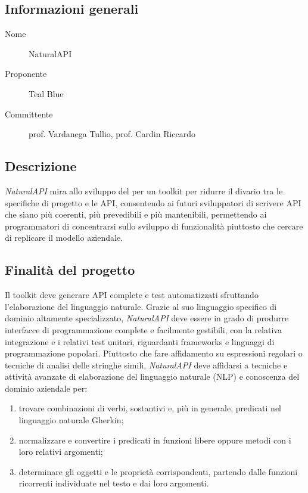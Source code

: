 \documentclass[../studio-di-fattibilita.tex]{subfiles}
\begin{document}
  \subsection{Informazioni generali}%
  \label{subsec:informazioni_generali}
  \begin{description}
    \item[Nome] NaturalAPI
    \item[Proponente] Teal Blue
    \item[Committente] prof. Vardanega Tullio, prof. Cardin Riccardo
  \end{description}


  \subsection{Descrizione}%
  \label{subsec:descrizione}
  \textit{NaturalAPI} mira allo sviluppo del  per un toolkit per ridurre il divario tra le specifiche di progetto e le API, consentendo ai futuri sviluppatori di scrivere API che siano più coerenti, più prevedibili e più mantenibili, permettendo ai programmatori di concentrarsi sullo sviluppo di funzionalità piuttosto che cercare di replicare il modello aziendale.


  \subsection{Finalità del progetto}%
  \label{subsec:finalita_del_progetto}
  Il toolkit deve generare API complete e test automatizzati sfruttando l'elaborazione del linguaggio naturale.
  Grazie al suo linguaggio specifico di dominio altamente specializzato, \textit{NaturalAPI} deve essere in grado di produrre interfacce di programmazione complete e facilmente gestibili, con la relativa integrazione e i relativi test unitari, riguardanti frameworks e linguaggi di programmazione popolari.
  Piuttosto che fare affidamento su espressioni regolari o tecniche di analisi delle stringhe simili, \textit{NaturalAPI} deve affidarsi a tecniche e attività avanzate di elaborazione del linguaggio naturale (NLP) e conoscenza del dominio aziendale per:
    \begin{enumerate}
      \item trovare combinazioni di verbi, sostantivi e, più in generale, predicati nel linguaggio naturale Gherkin;
      \item normalizzare e convertire i predicati in funzioni libere oppure metodi con i loro relativi argomenti;
      \item determinare gli oggetti e le proprietà corrispondenti, partendo dalle funzioni ricorrenti individuate nel testo e dai loro argomenti.
    \end{enumerate}
\end{document}

